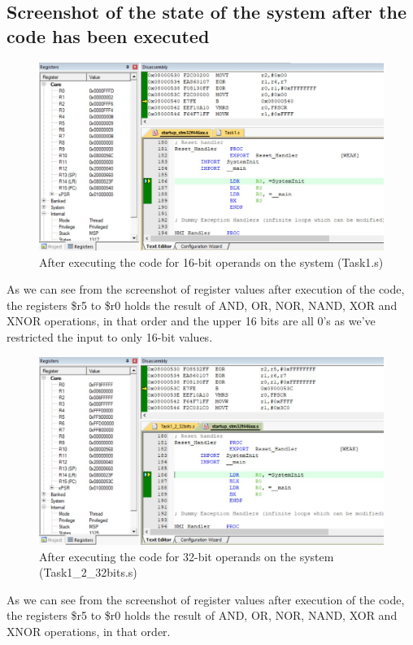 \documentclass[footheight=20pt, footsepline, headheight=20pt, headsepline]{scrartcl}
\begin{document}
\subsection*{Screenshot of the state of the system after the code has been executed}
\begin{figure}[h!]
    \centering
    \includegraphics[scale=.7]{images/Task1After1.jpg}
    \caption{After executing the code for 16-bit operands on the system (Task1.s)}
    \label{fig:after_task_one}
\end{figure}
\FloatBarrier
As we can see from the screenshot of register values after execution of the code, the registers \$r5 to \$r0 holds the result of AND, OR, NOR, NAND, XOR and XNOR operations, in that order and the upper 16 bits are all 0's as we've restricted the input to only 16-bit values.
\begin{figure}[ht]
    \centering
    \includegraphics[scale=.7]{images/Task1_1After1.jpg}
    \caption{After executing the code for 32-bit operands on the system (Task1\_2\_32bits.s)}
    \label{fig:after_task_one_one}
\end{figure}
\FloatBarrier
As we can see from the screenshot of register values after execution of the code, the registers \$r5 to \$r0 holds the result of AND, OR, NOR, NAND, XOR and XNOR operations, in that order.
\end{document}
